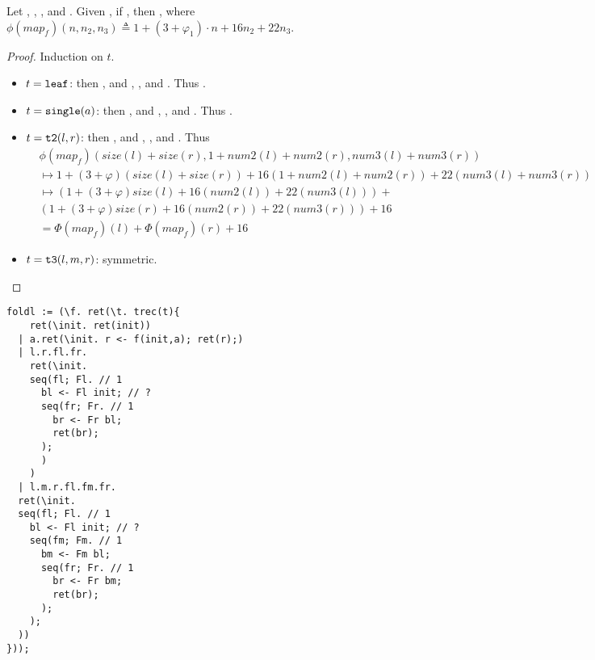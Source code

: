 \begin{lemma}
  Let , , , and .
  Given ,
  if , then , where
  $\phi(map_f)(n,n_2,n_3) \triangleq 1 + (3 + \varphi_1)\cdot n + 16n_2 + 22n_3$.
\end{lemma}

\begin{proof}
  Induction on $t$.
  \begin{itemize}
    \item $t = \mathtt{leaf}$: then , and , , and .
      Thus . 
    \item $t = \mathtt{single}(a)$:  then ,  and , , and .
      Thus . 
    \item $t = \mathtt{t2}(l,r)$: then , and , 
      , and .
      Thus 
      \begin{align*}
        & \phi(map_f)(size(l) + size(r),1 + num2(l) + num2(r),num3(l) + num3(r))\\
        &\mapsto 1 + (3 + \varphi)(size(l) + size(r)) + 16(1 + num2(l) + num2(r)) + 22(num3(l) + num3(r))\\
        &\mapsto \left(1 + (3 + \varphi)size(l) + 16(num2(l)) + 22(num3(l))\right) + \\
                 &\left(1 + (3 + \varphi)size(r) + 16(num2(r)) + 22(num3(r))\right) + 16\\
        &= \Phi(map_f)(l) + \Phi(map_f)(r) + 16 \tag{I.H.}
      \end{align*}
      \item $t = \mathtt{t3}(l,m,r)$: symmetric.
  \end{itemize}
\end{proof}

\begin{verbatim}
foldl := (\f. ret(\t. trec(t){
    ret(\init. ret(init))
  | a.ret(\init. r <- f(init,a); ret(r);)
  | l.r.fl.fr.
    ret(\init.
    seq(fl; Fl. // 1
      bl <- Fl init; // ?
      seq(fr; Fr. // 1
        br <- Fr bl;
        ret(br);
      );
      )
    )
  | l.m.r.fl.fm.fr.
  ret(\init.
  seq(fl; Fl. // 1
    bl <- Fl init; // ?
    seq(fm; Fm. // 1
      bm <- Fm bl;
      seq(fr; Fr. // 1
        br <- Fr bm;
        ret(br);
      );
    );
  ))
}));
\end{verbatim}

